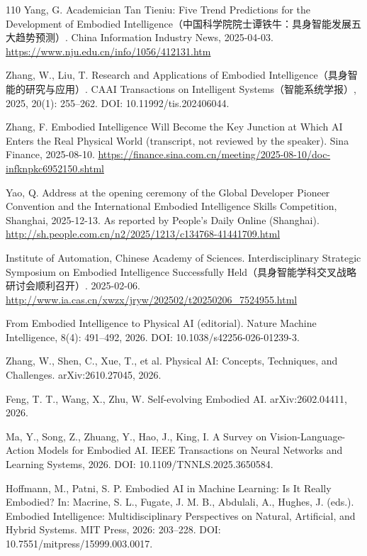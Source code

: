 \documentclass[10pt]{article}
\begin{document}
\begin{thebibliography}{110}
Yang, G. Academician Tan Tieniu: Five Trend Predictions for the Development of Embodied Intelligence（中国科学院院士谭铁牛：具身智能发展五大趋势预测）. China Information Industry News, 2025-04-03. \url{https://www.nju.edu.cn/info/1056/412131.htm}

Zhang, W., Liu, T. Research and Applications of Embodied Intelligence（具身智能的研究与应用）. CAAI Transactions on Intelligent Systems（智能系统学报）, 2025, 20(1): 255–262. DOI: 10.11992/tis.202406044.

Zhang, F. Embodied Intelligence Will Become the Key Junction at Which AI Enters the Real Physical World (transcript, not reviewed by the speaker). Sina Finance, 2025-08-10. \url{https://finance.sina.com.cn/meeting/2025-08-10/doc-infknpkc6952150.shtml}

Yao, Q. Address at the opening ceremony of the Global Developer Pioneer Convention and the International Embodied Intelligence Skills Competition, Shanghai, 2025-12-13. As reported by People's Daily Online (Shanghai). \url{http://sh.people.com.cn/n2/2025/1213/c134768-41441709.html}

Institute of Automation, Chinese Academy of Sciences. Interdisciplinary Strategic Symposium on Embodied Intelligence Successfully Held（具身智能学科交叉战略研讨会顺利召开）. 2025-02-06. \url{http://www.ia.cas.cn/xwzx/jryw/202502/t20250206_7524955.html}

From Embodied Intelligence to Physical AI (editorial). Nature Machine Intelligence, 8(4): 491–492, 2026. DOI: 10.1038/s42256-026-01239-3.

Zhang, W., Shen, C., Xue, T., et al. Physical AI: Concepts, Techniques, and Challenges. arXiv:2610.27045, 2026.

Feng, T. T., Wang, X., Zhu, W. Self-evolving Embodied AI. arXiv:2602.04411, 2026.

Ma, Y., Song, Z., Zhuang, Y., Hao, J., King, I. A Survey on Vision-Language-Action Models for Embodied AI. IEEE Transactions on Neural Networks and Learning Systems, 2026. DOI: 10.1109/TNNLS.2025.3650584.

Hoffmann, M., Patni, S. P. Embodied AI in Machine Learning: Is It Really Embodied? In: Macrine, S. L., Fugate, J. M. B., Abdulali, A., Hughes, J. (eds.). Embodied Intelligence: Multidisciplinary Perspectives on Natural, Artificial, and Hybrid Systems. MIT Press, 2026: 203–228. DOI: 10.7551/mitpress/15999.003.0017.


\end{thebibliography}
\end{document}
